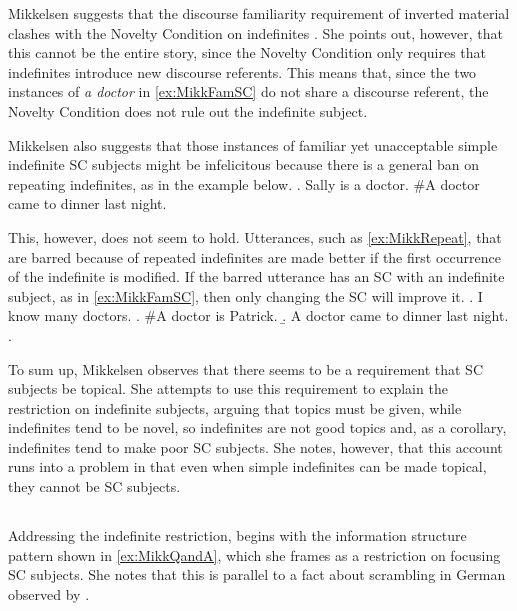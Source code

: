 \documentclass[letterpaper]{article}
\begin{document}
Mikkelsen suggests that the discourse familiarity requirement of inverted material clashes with the Novelty Condition on indefinites \parencite{heim1982semantics}.
She points out, however, that this cannot be the entire story, since the Novelty Condition only requires that indefinites introduce new discourse referents.
This means that, since the two instances of \textit{a doctor} in \ref{ex:MikkFamSC} do not share a discourse referent, the Novelty Condition does not rule out the indefinite subject.

Mikkelsen also suggests that those instances of familiar yet unacceptable simple indefinite SC subjects might be infelicitous because there is a general ban on repeating indefinites, as in the example below.
\ex.\label{ex:MikkRepeat} Sally is a doctor. \#A doctor came to dinner last night.

This, however, does not seem to hold.
Utterances, such as \ref{ex:MikkRepeat}, that are barred because of repeated indefinites are made better if the first occurrence of the indefinite is modified.
If the barred utterance has an SC with an indefinite subject, as in \ref{ex:MikkFamSC}, then only changing the SC will improve it.
\ex.\label{ex:IndefGiven} I know many doctors.
\a. \#A doctor is Patrick.
\b. A doctor came to dinner last night.
\z.

To sum up, Mikkelsen observes that there seems to be a requirement that SC subjects be topical.
She attempts to use this requirement to explain the restriction on indefinite subjects, arguing that topics must be given, while indefinites tend to be novel, so indefinites are not good topics and, as a corollary, indefinites tend to make poor SC subjects.
She notes, however, that this account runs into a problem in that even when simple indefinites can be made topical, they cannot be SC subjects.
\subsection{\textcite{heycock2012specification}}\label{sec:Heycock}
Addressing the indefinite restriction, \textcite{heycock2012specification} begins with the information structure pattern shown in \ref{ex:MikkQandA}, which she frames as a restriction on focusing SC subjects.
She notes that this is parallel to a fact about scrambling in German observed by \textcite{lenerz1977zur}.
\end{document}

